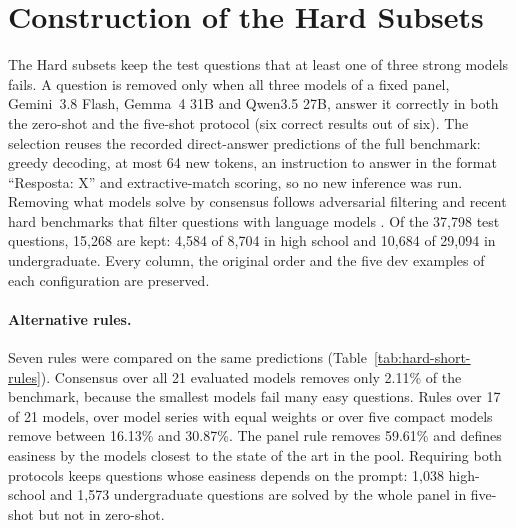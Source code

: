 %
%

\providecommand{\HardFigDir}{figures}

\section{Construction of the Hard Subsets}
\label{app:hard-short}

The Hard subsets keep the test questions that at least one of three strong
models fails. A question is removed only when all three models of a fixed
panel, Gemini~3.8 Flash, Gemma~4 31B and Qwen3.5 27B, answer it correctly in
both the zero-shot and the five-shot protocol (six correct results out of
six). The selection reuses the recorded direct-answer predictions of the full
benchmark: greedy decoding, at most 64 new tokens, an instruction to answer
in the format ``Resposta: X'' and extractive-match scoring, so no new
inference was run. Removing what models solve by consensus follows
adversarial filtering
\citep{zellers2018swag,lebras2020aflite} and recent hard benchmarks that
filter questions with language models \citep{suzgun2023bbh,wang2024mmlupro}.
Of the 37,798 test questions, 15,268 are kept: 4,584 of 8,704 in high school
and 10,684 of 29,094 in undergraduate. Every column, the original order and
the five dev examples of each configuration are preserved.

\paragraph{Alternative rules.} Seven rules were compared on the same
predictions (Table~\ref{tab:hard-short-rules}). Consensus over all 21
evaluated models removes only 2.11\% of the benchmark, because the smallest
models fail many easy questions. Rules over 17 of 21 models, over model
series with equal weights or over five compact models remove between 16.13\%
and 30.87\%. The panel rule removes 59.61\% and defines easiness by the
models closest to the state of the art in the pool. Requiring both protocols
keeps questions whose easiness depends on the prompt: 1,038 high-school and
1,573 undergraduate questions are solved by the whole panel in five-shot but
not in zero-shot.

